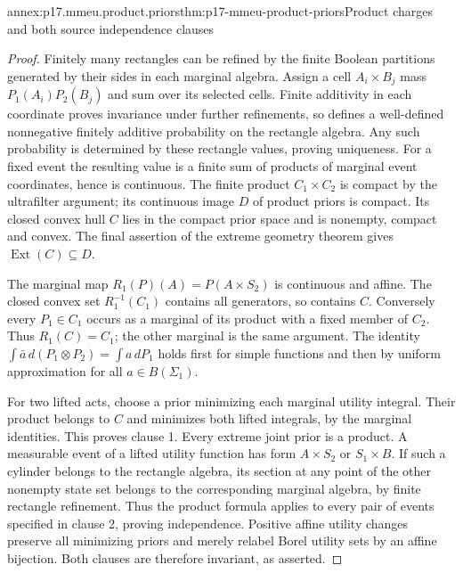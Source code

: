 \begin{annexitem}{annex:p17.mmeu.product.priors}{thm:p17-mmeu-product-priors}{Product charges and both source independence clauses}
\begin{proof}
Finitely many rectangles can be refined
by the finite Boolean partitions generated
by their sides in each marginal algebra.
Assign a cell \(A_i\times B_j\) mass
\(P_1(A_i)P_2(B_j)\) and sum over its
selected cells. Finite additivity in
each coordinate proves invariance under
further refinements, so defines a
well-defined nonnegative finitely additive
probability on the rectangle algebra.
Any such probability is determined by
these rectangle values, proving uniqueness.
For a fixed event the resulting value
is a finite sum of products of marginal
event coordinates, hence is continuous.
The finite product \(C_1\times C_2\)
is compact by the ultrafilter argument;
its continuous image \(D\) of product
priors is compact.
Its closed convex hull \(C\) lies in
the compact prior space and is
nonempty, compact and convex.
The final assertion of the extreme
geometry theorem gives
\(\operatorname{Ext}(C)\subseteq D\).

The marginal map \(R_1(P)(A)=P(A\times S_2)\)
is continuous and affine. The closed
convex set \(R_1^{-1}(C_1)\) contains
all generators, so contains \(C\).
Conversely every \(P_1\in C_1\)
occurs as a marginal of its product
with a fixed member of \(C_2\).
Thus \(R_1(C)=C_1\); the other
marginal is the same argument.
The identity
\(\int\bar a\,d(P_1\otimes P_2)=\int a\,dP_1\)
holds first for simple functions and
then by uniform approximation for
all \(a\in B(\Sigma_1)\).

For two lifted acts, choose a prior
minimizing each marginal utility
integral. Their product belongs to
\(C\) and minimizes both lifted
integrals, by the marginal identities.
This proves clause 1.
Every extreme joint prior is a product.
A measurable event of a lifted
utility function has form \(A\times S_2\)
or \(S_1\times B\). If such a
cylinder belongs to the rectangle
algebra, its section at any point
of the other nonempty state set
belongs to the corresponding marginal
algebra, by finite rectangle refinement.
Thus the product formula applies to
every pair of events specified in
clause 2, proving independence.
Positive affine utility changes preserve
all minimizing priors and merely
relabel Borel utility sets by an
affine bijection. Both clauses are
therefore invariant, as asserted.
\end{proof}
\end{annexitem}

